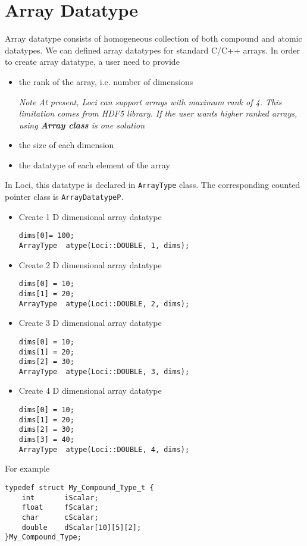\section{Array Datatype}
Array datatype consists of homogeneous collection of both compound and 
atomic datatypes. We can defined array datatypes for standard C/C++
arrays. In order to create array datatype, a user need to provide
\begin{itemize}
\item the rank of the array, i.e. number of dimensions 
\par {\em Note At present, Loci can support arrays with maximum rank of
4. This limitation comes from HDF5 library. If the user wants higher ranked
arrays, using {\bf Array class} is one solution}
\item the size of each dimension
\item the datatype of each element of the array
\end{itemize}
\par In Loci, this datatype is declared in {\tt ArrayType} class. The 
corresponding counted pointer class is {\tt ArrayDatatypeP}.
%
\begin{itemize}
\item Create 1 D dimensional array datatype
\begin{verbatim}
dims[0]= 100;
ArrayType  atype(Loci::DOUBLE, 1, dims);
\end{verbatim}
%
\item Create 2 D dimensional array datatype
\begin{verbatim}
dims[0] = 10;
dims[1] = 20;
ArrayType  atype(Loci::DOUBLE, 2, dims);
\end{verbatim}
%
\item Create 3 D dimensional array datatype
\begin{verbatim}
dims[0] = 10;
dims[1] = 20;
dims[2] = 30;
ArrayType  atype(Loci::DOUBLE, 3, dims);
\end{verbatim}
%
\item Create 4 D dimensional array datatype
\begin{verbatim}
dims[0] = 10;
dims[1] = 20;
dims[2] = 30;
dims[3] = 40;
ArrayType  atype(Loci::DOUBLE, 4, dims);
\end{verbatim}
\end{itemize}
%
%
\par For example
\begin{verbatim}
typedef struct My_Compound_Type_t {
    int       iScalar;
    float     fScalar;
    char      cScalar;
    double    dScalar[10][5][2];
}My_Compound_Type;
\end{verbatim}
